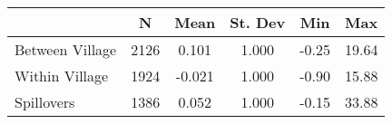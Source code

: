 \begin{tabular}{l*{5}{c}}\hline&\multicolumn{1}{c}{N}&\multicolumn{1}{c}{Mean}&\multicolumn{1}{c}{St. Dev}&\multicolumn{1}{c}{Min}&\multicolumn{1}{c}{Max}\\ \hline 
Between Village & 2126 & 0.101 & 1.000 & -0.25 & 19.64 \\
Within Village & 1924 & -0.021 & 1.000 & -0.90 & 15.88 \\
Spillovers & 1386 & 0.052 & 1.000 & -0.15 & 33.88 \\
\hline \end{tabular}
